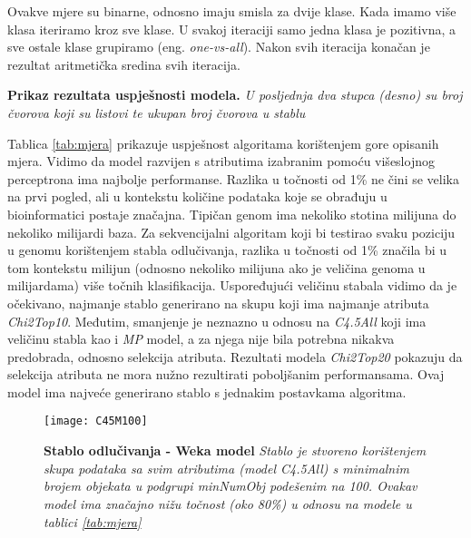 Ovakve mjere su binarne, odnosno imaju smisla za dvije klase. Kada imamo više klasa iteriramo kroz sve klase. U svakoj iteraciji samo jedna klasa je pozitivna, a sve ostale klase grupiramo (eng. \textit{one-vs-all}). Nakon svih iteracija konačan je rezultat aritmetička sredina svih iteracija.

\begin{table}[!ht]
    \centering
    \caption[Prikaz rezultata uspješnosti modela]{\textbf{Prikaz rezultata uspješnosti modela.} \textit{U posljednja dva stupca (desno) su broj čvorova koji su listovi te ukupan broj čvorova u stablu}}
    \label{tab:mjera}
\end{table}

Tablica \ref{tab:mjera} prikazuje uspješnost algoritama korištenjem gore opisanih mjera. Vidimo da model razvijen s atributima izabranim pomoću višeslojnog perceptrona ima najbolje performanse. Razlika u točnosti od 1\% ne čini se velika na prvi pogled, ali u kontekstu količine podataka koje se obrađuju u bioinformatici postaje značajna. Tipičan genom ima nekoliko stotina milijuna do nekoliko milijardi baza. Za sekvencijalni algoritam koji bi testirao svaku poziciju u genomu korištenjem stabla odlučivanja, razlika u točnosti od 1\% značila bi u tom kontekstu milijun (odnosno nekoliko milijuna ako je veličina genoma u milijardama) više točnih klasifikacija.
Uspoređujući veličinu stabala vidimo da je očekivano, najmanje stablo generirano na skupu koji ima najmanje atributa \textit{Chi2Top10}. Međutim, smanjenje je neznazno u odnosu na \textit{C4.5All} koji ima veličinu stabla kao i \textit{MP} model, a za njega nije bila potrebna nikakva predobrada, odnosno selekcija atributa. 
Rezultati modela \textit{Chi2Top20} pokazuju da selekcija atributa ne mora nužno rezultirati poboljšanim performansama. Ovaj model ima najveće generirano stablo s jednakim postavkama algoritma.
\begin{figure}[!ht]
    \centering
    \texttt{[image: C45M100]}
    \caption[Primjer modela stabla odlučivanja]{\textbf{Stablo odlučivanja - Weka model}  \textit{Stablo je stvoreno korištenjem skupa podataka sa svim atributima (model C4.5All) s minimalnim brojem objekata u podgrupi \textit{minNumObj} podešenim na 100. Ovakav model ima značajno nižu točnost (oko 80\%) u odnosu na modele u tablici \ref{tab:mjera}}}
    \label{fig:C45M100}
\end{figure}

